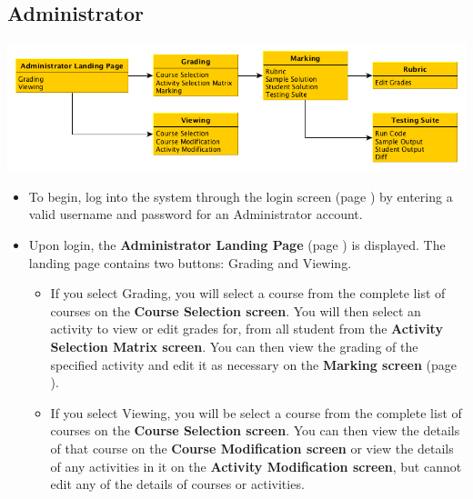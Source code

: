 \documentclass{article}
\begin{document}
\subsection{Administrator}
\centerline{\includegraphics[scale=.6]{../images/UIMockups/pngs/admin}}
\begin{itemize}
	\item To begin, log into the system through the login screen (page \pageref{login})
		by entering a valid username and password for an Administrator account.
	\item Upon login, the \textbf{Administrator Landing Page} (page \pageref{landPg})
		is displayed. The landing page contains two buttons: Grading and Viewing.
	\begin{itemize}
		\item If you select Grading, you will select a course from the complete list of 
			courses on the \textbf{Course Selection screen}. You will then select an 
			activity to view or edit grades for, from all student from the \textbf{Activity 
			Selection Matrix screen}. You can then view the grading of the specified
			activity and edit it as necessary on the \textbf{Marking screen} (page
			\pageref{marking}).
		\item If you select Viewing, you will be select a course from the complete list of 
			courses on the \textbf{Course Selection screen}. You can then view the
			details of that course on the \textbf{Course Modification screen} or view the
			details of any activities in it on the \textbf{Activity Modification screen}, but
			cannot edit any of the details of courses or activities.
	\end{itemize}
\end{itemize}
\end{document}
